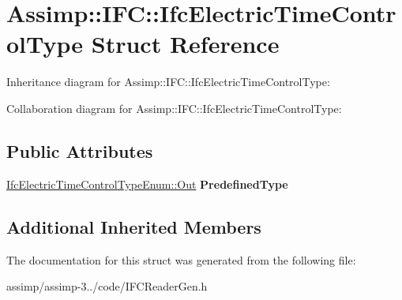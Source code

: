\hypertarget{struct_assimp_1_1_i_f_c_1_1_ifc_electric_time_control_type}{\section{Assimp\+:\+:I\+F\+C\+:\+:Ifc\+Electric\+Time\+Control\+Type Struct Reference}
\label{struct_assimp_1_1_i_f_c_1_1_ifc_electric_time_control_type}
}


Inheritance diagram for Assimp\+:\+:I\+F\+C\+:\+:Ifc\+Electric\+Time\+Control\+Type\+:


Collaboration diagram for Assimp\+:\+:I\+F\+C\+:\+:Ifc\+Electric\+Time\+Control\+Type\+:
\subsection*{Public Attributes}
\begin{DoxyCompactItemize}
\item 
\hypertarget{struct_assimp_1_1_i_f_c_1_1_ifc_electric_time_control_type_a6207f462e6c8cd1364f592248617f39a}{\hyperlink{classboost_1_1shared__ptr}{Ifc\+Electric\+Time\+Control\+Type\+Enum\+::\+Out} {\bfseries Predefined\+Type}}\label{struct_assimp_1_1_i_f_c_1_1_ifc_electric_time_control_type_a6207f462e6c8cd1364f592248617f39a}

\end{DoxyCompactItemize}
\subsection*{Additional Inherited Members}


The documentation for this struct was generated from the following file\+:\begin{DoxyCompactItemize}
\item 
assimp/assimp-\/3../code/I\+F\+C\+Reader\+Gen.\+h\end{DoxyCompactItemize}
